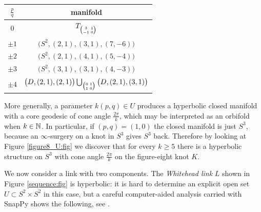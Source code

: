 \begin{table}
\begin{center}
\begin{tabular}{c||c}
$\frac pq$ & manifold \phantom{\Big|}\!\! \\
\hline
\hline
$0$ & $T_{\matr 31{-1}0}$ \phantom{\Big|}\!\!  \\
$\pm 1$ & $\big(S^2, (2,1), (3,1), (7,-6)\big)$  \phantom{\Big|}\!\! \\
$\pm 2$ & $\big(S^2, (2,1), (4,1), (5,-4)\big)$  \phantom{\Big|}\!\! \\
$\pm 3$ & $\big(S^2, (3,1), (3,1), (4,-3)\big)$  \phantom{\Big|}\!\! \\
$\pm 4$ & $\big(D,(2,1), (2,1)\big) \bigcup_{\matr 0110} \big(D, (2,1), (3,1)\big) $\phantom{\Big|}\!\!
\end{tabular}
\vspace{.2 cm}
\label{non:hyp:table}
\end{center}
\end{table}

More generally, a parameter $k(p,q) \in U$ produces a hyperbolic closed manifold with a core geodesic of cone angle $\frac{2\pi}k$, which may be interpreted as an orbifold when $k\in \mathbb{N}$. In particular, if $(p,q) = (1,0)$ the closed manifold is just $S^3$, because an $\infty$-surgery on a knot in $S^3$ gives $S^3$ back. Therefore by looking at Figure \ref{figure8_U:fig} we discover that for every $k\geqslant 5$ there is a hyperbolic structure on $S^3$ with cone angle $\frac{2\pi}k$ on the figure-eight knot $K$. 

We now consider a link with two components.
The \emph{Whitehead link} $L$ shown in Figure \ref{sequence:fig} is hyperbolic: it is hard to determine an explicit open set $U\subset S^2\times S^2$ in this case, but a careful computer-aided analysis carried with SnapPy \cite{Sna} shows the following, see \cite{MP}.

